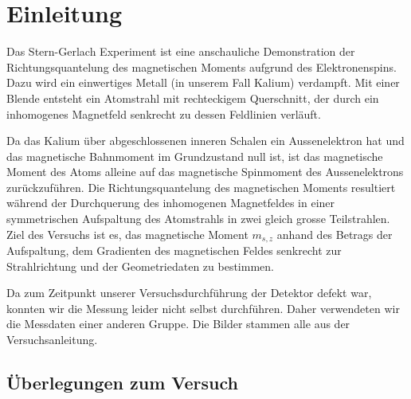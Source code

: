 \documentclass[a4paper,parskip,11pt, DIV12]{scrreprt}
\begin{document}
\fancyfoot{}
\fancyfoot[R]{\small \thepage}
\fancyfoot[L]{}
\fancyfoot[C]{}
\renewcommand{\footrulewidth}{0.4pt} 

\addtolength{\headheight}{2\baselineskip}
\addtolength{\headheight}{0.6pt}


\renewcommand{\headrulewidth}{0.6pt}
\renewcommand{\footrulewidth}{0.4pt}

\renewcommand{\chaptermark}[1]{ \markboth{#1}{} } %


\tableofcontents

\chapter{Einleitung}

Das Stern-Gerlach Experiment ist eine anschauliche Demonstration der Richtungsquantelung des magnetischen Moments aufgrund des Elektronenspins. Dazu wird ein einwertiges Metall (in unserem Fall Kalium) verdampft. Mit einer Blende entsteht ein Atomstrahl mit rechteckigem Querschnitt, der durch ein inhomogenes Magnetfeld senkrecht zu dessen Feldlinien verläuft. 
 
 Da das Kalium über abgeschlossenen inneren Schalen ein Aussenelektron hat und das magnetische Bahnmoment im Grundzustand null ist, ist das magnetische Moment des Atoms alleine auf das magnetische Spinmoment des Aussenelektrons zurückzuführen. Die Richtungsquantelung des magnetischen Moments resultiert während der Durchquerung des inhomogenen Magnetfeldes in einer symmetrischen Aufspaltung des Atomstrahls in zwei gleich grosse Teilstrahlen. Ziel des Versuchs ist es, das magnetische Moment $m_{s,z}$ anhand des Betrags der Aufspaltung, dem Gradienten des magnetischen Feldes senkrecht zur Strahlrichtung und der Geometriedaten zu bestimmen.
 
 Da zum Zeitpunkt unserer Versuchsdurchführung der Detektor defekt war, konnten wir die Messung leider nicht selbst durchführen. Daher verwendeten wir die Messdaten einer anderen Gruppe. Die Bilder stammen alle aus der Versuchsanleitung.
 
 \section{Überlegungen zum Versuch}
 
\end{document}
